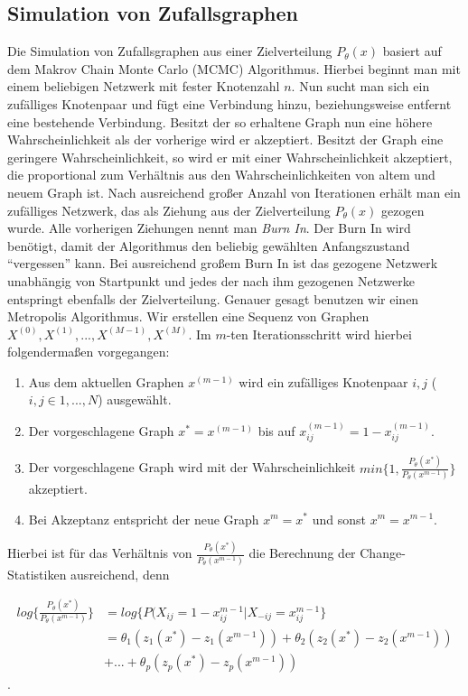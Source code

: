 \documentclass[a4paper,ngerman,oneside,titlepage,bibliography=totoc,11pt]{scrreprt}
\begin{document}
\subsection{Simulation von Zufallsgraphen}
\label{sec:simzuf}
Die Simulation von Zufallsgraphen aus einer Zielverteilung $P_\theta(x)$ basiert auf dem Makrov Chain Monte Carlo (MCMC) Algorithmus. Hierbei beginnt man mit einem beliebigen Netzwerk mit fester Knotenzahl $n$. Nun sucht man sich ein zufälliges Knotenpaar und fügt eine Verbindung hinzu, beziehungsweise entfernt eine bestehende Verbindung. Besitzt der so erhaltene Graph nun eine höhere Wahrscheinlichkeit als der vorherige wird er akzeptiert. Besitzt der Graph eine geringere Wahrscheinlichkeit, so wird er mit einer Wahrscheinlichkeit akzeptiert, die proportional zum Verhältnis aus den Wahrscheinlichkeiten von altem und neuem Graph ist. Nach ausreichend großer Anzahl von Iterationen erhält man ein zufälliges Netzwerk, das als Ziehung aus der Zielverteilung $P_\theta(x)$ gezogen wurde. Alle vorherigen Ziehungen nennt man \emph{Burn In}. Der Burn In wird benötigt, damit der Algorithmus den beliebig gewählten Anfangszustand "`vergessen"' kann. Bei ausreichend großem Burn In ist das gezogene Netzwerk unabhängig von Startpunkt und jedes der nach ihm gezogenen Netzwerke entspringt ebenfalls der Zielverteilung.
Genauer gesagt benutzen wir einen Metropolis Algorithmus. Wir erstellen eine Sequenz von Graphen $X^{(0)}, X^{(1)}, ..., X^{(M-1)}, X^{(M)}$. Im $m$-ten Iterationsschritt wird hierbei folgendermaßen vorgegangen:

\begin{enumerate}
	\item Aus dem aktuellen Graphen $x^{(m-1)}$ wird ein zufälliges Knotenpaar $i,j$ ($i,j \in 1, ...,N$) ausgewählt.
	\item Der vorgeschlagene Graph $x^* = x^{(m-1)}$ bis auf $x_{ij}^{(m-1)} = 1 - x_{ij}^{(m-1)}$.
	\item Der vorgeschlagene Graph wird mit der Wahrscheinlichkeit $min\{1, \frac{P_{\theta}(x^*)}{P_{\theta}(x^{m-1})}\}$ akzeptiert.
	\item Bei Akzeptanz entspricht der neue Graph $x^m = x^*$ und sonst $x^m = x^{m-1}$.
\end{enumerate}

Hierbei ist für das Verhältnis von $\frac{P_{\theta}(x^*)}{P_{\theta}(x^{m-1})}$ die Berechnung der Change-Statistiken ausreichend, denn

\begin{align*}
log\{\frac{P_{\theta}(x^*)}{P_{\theta}(x^{m-1})}\} &= log\{P(X_{ij} = 1-x_{ij}^{m-1}|X_{-ij}=x_{ij}^{m-1}\} \\
																										&= \theta_1(z_1(x^*) - z_1(x^{m-1})) + \theta_2(z_2(x^*) - z_2(x^{m-1}))\\   																									& + ... + \theta_p(z_p(x^*) - z_p(x^{m-1}))
\end{align*}.
\end{document}
